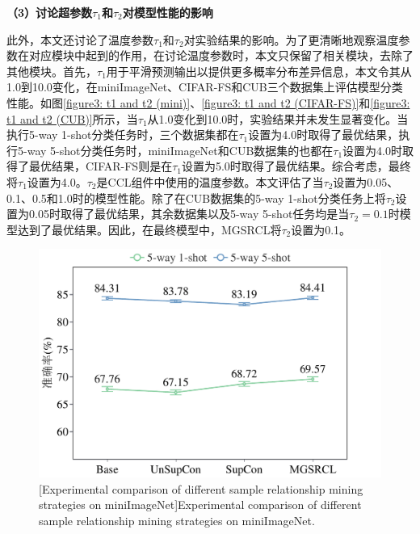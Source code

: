 \textbf{（3）讨论超参数$\tau_1$和$\tau_2$对模型性能的影响}

此外，本文还讨论了温度参数$\tau_1$和$\tau_2$对实验结果的影响。为了更清晰地观察温度参数在对应模块中起到的作用，在讨论温度参数时，本文只保留了相关模块，去除了其他模块。首先，$\tau_1$用于平滑预测输出以提供更多概率分布差异信息，本文令其从1.0到10.0变化，在miniImageNet、CIFAR-FS和CUB三个数据集上评估模型分类性能。如图\ref{figure3: t1 and t2 (mini)}、\ref{figure3: t1 and t2 (CIFAR-FS)}和\ref{figure3: t1 and t2 (CUB)}所示，当$\tau_1$从1.0变化到10.0时，实验结果并未发生显著变化。当执行5-way 1-shot分类任务时，三个数据集都在$\tau_1$设置为4.0时取得了最优结果，执行5-way 5-shot分类任务时，miniImageNet和CUB数据集的也都在$\tau_1$设置为4.0时取得了最优结果，CIFAR-FS则是在$\tau_1$设置为5.0时取得了最优结果。综合考虑，最终将$\tau_1$设置为4.0。$\tau_2$是CCL组件中使用的温度参数。本文评估了当$\tau_2$设置为0.05、0.1、0.5和1.0时的模型性能。除了在CUB数据集的5-way 1-shot分类任务上将$\tau_2$设置为0.05时取得了最优结果，其余数据集以及5-way 5-shot任务均是当$\tau_2 = 0.1$时模型达到了最优结果。因此，在最终模型中，MGSRCL将$\tau_2$设置为0.1。


\begin{figure}[h!]
  \centering
  \includegraphics[width=0.6\columnwidth]{figures/MGSRCL/miniImageNet/comparison.pdf}
  [Experimental comparison of different sample relationship mining strategies on miniImageNet]{Experimental comparison of different sample relationship mining strategies on miniImageNet.}
  \label{figure3: comparison(miniImageNet)}
\end{figure}

